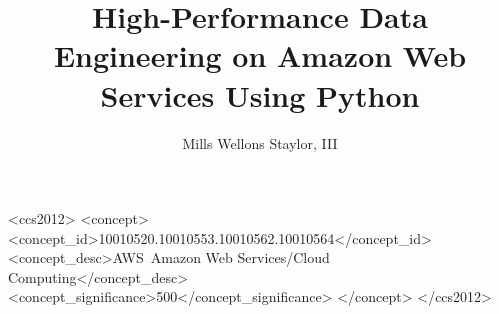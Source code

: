 \documentclass[sigconf]{acmart}
\begin{document}
\title{High-Performance Data Engineering on Amazon Web Services Using Python}
\author{Mills Wellons Staylor, III}




%
\begin{CCSXML}
<ccs2012>
<concept>
<concept_id>10010520.10010553.10010562.10010564</concept_id>
<concept_desc>AWS~Amazon Web Services/Cloud Computing</concept_desc>
<concept_significance>500</concept_significance>
</concept>
</ccs2012>
\end{CCSXML}




\maketitle
















%

\end{document}
